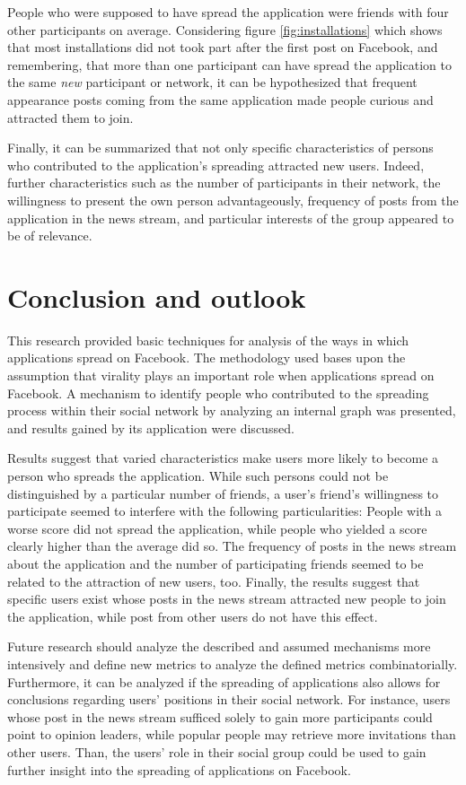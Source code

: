 \documentclass[preprint,12pt]{elsarticle}
\begin{document}
People who were supposed to have spread the application were
friends with four other participants on average. Considering figure
\ref{fig:installations} which shows that most installations did not
took part after the first post on Facebook, and remembering, that
more than one participant can have spread the application to the same
\textit{new} participant or network, it can be hypothesized that frequent appearance
posts coming from the same application made people curious and
attracted them to join. 

Finally, it can be summarized that not only
specific characteristics of persons who contributed to the
application's spreading attracted new users. Indeed, further
characteristics such as the number of participants in their network,
the willingness to present the own person advantageously,
frequency of posts from the application in the news stream, and particular
interests of the group appeared to be of relevance.


\section{Conclusion and outlook}
\label{sec:conclusion}
This research provided basic techniques for analysis of the ways in which
applications spread on Facebook. The methodology used bases upon the
assumption that virality plays an important role when applications
spread on Facebook. A mechanism to identify people who contributed to
the spreading process within their social network by analyzing an internal
graph was presented, and results gained by its application were discussed.

Results suggest that varied characteristics make users more likely to
become a person who spreads the application. While such persons could
not be distinguished by a particular number of friends, a user's friend's
willingness to participate seemed to interfere with the following particularities:
People with a worse score did not spread the application, while
people who yielded a score clearly higher than the average did so. The
frequency of posts in the news stream about the application and the
number of participating friends seemed to be related to the attraction
of new users, too. Finally, the results suggest that specific users
exist whose posts in the news stream attracted new people to join
the application, while post from other users do not have this effect. 

Future research should  analyze the described and assumed
mechanisms more intensively and define new metrics to analyze the
defined metrics combinatorially. Furthermore, it can be analyzed if the spreading of
applications also allows for conclusions regarding users' positions in
their social network. For instance, users whose post in the
news stream sufficed solely to gain more participants could point to
opinion leaders, while popular people may retrieve more invitations
than other users. Than, the users' role in their social group could be
used to gain further insight into the spreading of applications on Facebook.
\end{document}
